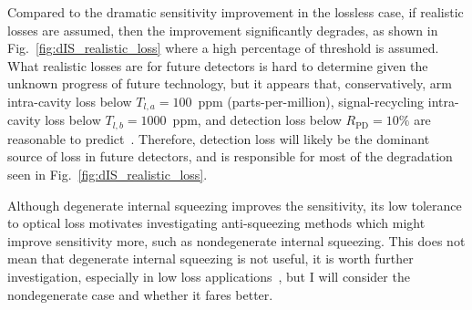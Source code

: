 Compared to the dramatic sensitivity improvement in the lossless case, if realistic losses are assumed, then the improvement significantly degrades, as shown in Fig.~\ref{fig:dIS_realistic_loss} where a high percentage of threshold is assumed. What realistic losses are for future detectors is hard to determine given the unknown progress of future technology, but it appears that, conservatively, arm intra-cavity loss below $T_{l,a}=100$~ppm (parts-per-million), signal-recycling intra-cavity loss below $T_{l,b}=1000$~ppm, and detection loss below $R_\text{PD}=10\%$ are reasonable to predict~\cite{Zhang2021,}. Therefore, detection loss will likely be the dominant source of loss in future detectors, and is responsible for most of the degradation seen in Fig.~\ref{fig:dIS_realistic_loss}. 

Although degenerate internal squeezing improves the sensitivity, its low tolerance to optical loss motivates investigating anti-squeezing methods which might improve sensitivity more, such as nondegenerate internal squeezing.  This does not mean that degenerate internal squeezing is not useful, it is worth further investigation, especially in low loss applications~\cite{}, but I will consider the nondegenerate case and whether it fares better.





